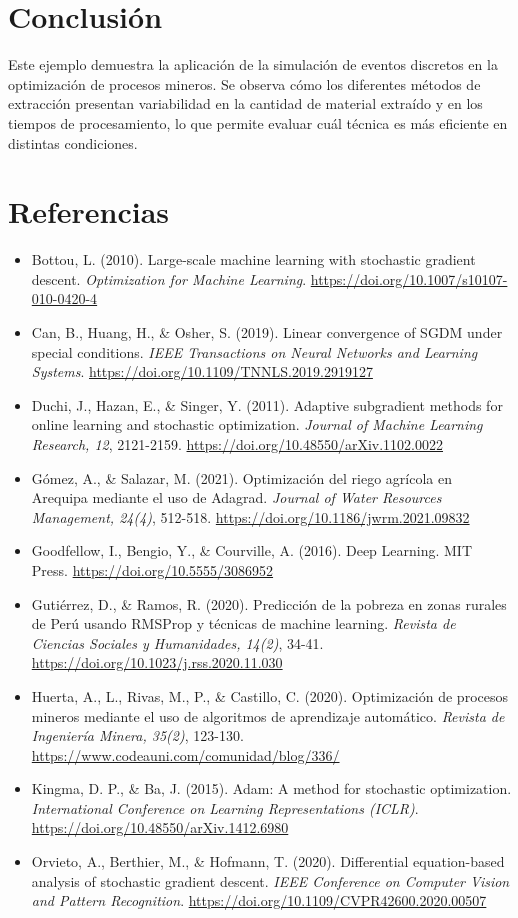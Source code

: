 \documentclass{article}
\begin{document}
\section*{Conclusión}
Este ejemplo demuestra la aplicación de la simulación de eventos discretos en la optimización de procesos mineros. Se observa cómo los diferentes métodos de extracción presentan variabilidad en la cantidad de material extraído y en los tiempos de procesamiento, lo que permite evaluar cuál técnica es más eficiente en distintas condiciones.


	\newpage
	\section*{Referencias}
	
\begin{itemize}
	\item Bottou, L. (2010). Large-scale machine learning with stochastic gradient descent. \textit{Optimization for Machine Learning}. \url{https://doi.org/10.1007/s10107-010-0420-4}
	\item Can, B., Huang, H., \& Osher, S. (2019). Linear convergence of SGDM under special conditions. \textit{IEEE Transactions on Neural Networks and Learning Systems}. \url{https://doi.org/10.1109/TNNLS.2019.2919127}
	\item Duchi, J., Hazan, E., \& Singer, Y. (2011). Adaptive subgradient methods for online learning and stochastic optimization. \textit{Journal of Machine Learning Research, 12}, 2121-2159. \url{https://doi.org/10.48550/arXiv.1102.0022}
	\item Gómez, A., \& Salazar, M. (2021). Optimización del riego agrícola en Arequipa mediante el uso de Adagrad. \textit{Journal of Water Resources Management, 24(4)}, 512-518. \url{https://doi.org/10.1186/jwrm.2021.09832}
	\item Goodfellow, I., Bengio, Y., \& Courville, A. (2016). Deep Learning. MIT Press. \url{https://doi.org/10.5555/3086952}
	\item Gutiérrez, D., \& Ramos, R. (2020). Predicción de la pobreza en zonas rurales de Perú usando RMSProp y técnicas de machine learning. \textit{Revista de Ciencias Sociales y Humanidades, 14(2)}, 34-41. \url{https://doi.org/10.1023/j.rss.2020.11.030}
	\item Huerta, A., L., Rivas, M., P., \& Castillo, C. (2020). Optimización de procesos mineros mediante el uso de algoritmos de aprendizaje automático. \textit{Revista de Ingeniería Minera, 35(2)}, 123-130. \url{https://www.codeauni.com/comunidad/blog/336/}
	\item Kingma, D. P., \& Ba, J. (2015). Adam: A method for stochastic optimization. \textit{International Conference on Learning Representations (ICLR)}. \url{https://doi.org/10.48550/arXiv.1412.6980}
	\item Orvieto, A., Berthier, M., \& Hofmann, T. (2020). Differential equation-based analysis of stochastic gradient descent. \textit{IEEE Conference on Computer Vision and Pattern Recognition}. \url{https://doi.org/10.1109/CVPR42600.2020.00507}


\end{itemize}
\end{document}
